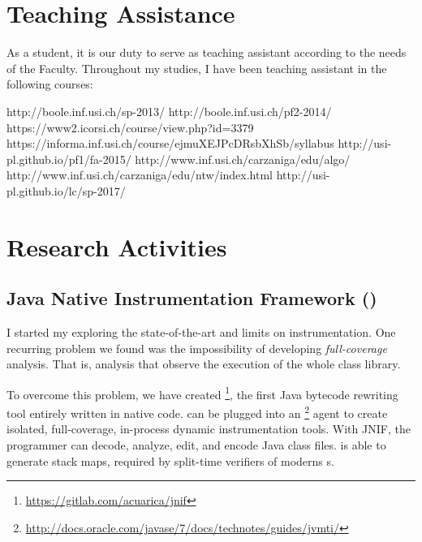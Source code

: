 \section{Teaching Assistance} \label{sec:ta}

As a \phd{} student, it is our duty to serve as teaching assistant according to the needs of the Faculty.
Throughout my \phd{} studies, I have been teaching assistant in the following courses:

\begin{tas}
	{http://boole.inf.usi.ch/sp-2013/}
	{http://boole.inf.usi.ch/pf2-2014/}
	{https://www2.icorsi.ch/course/view.php?id=3379}
	{https://informa.inf.usi.ch/course/ejmuXEJPcDRsbXhSb/syllabus}
	{http://usi-pl.github.io/pf1/fa-2015/}
	{http://www.inf.usi.ch/carzaniga/edu/algo/}
	{http://www.inf.usi.ch/carzaniga/edu/ntw/index.html}
	{http://usi-pl.github.io/lc/sp-2017/}
\end{tas}

\section{Research Activities} \label{sec:research}

\subsection*{Java Native Instrumentation Framework (\jnif{})}

I started my \phd{} exploring the state-of-the-art and limits on \java{} instrumentation.
One recurring problem we found was the impossibility of developing \emph{full-coverage} analysis.
That is, analysis that observe the execution of the whole \java{} class library.

To overcome this problem, we have created \jnif{}\footnote{\url{https://gitlab.com/acuarica/jnif}}, the first Java bytecode rewriting tool entirely written in native code.
\jnif{} can be plugged into an \jvmti{}\footnote{\url{http://docs.oracle.com/javase/7/docs/technotes/guides/jvmti/}} agent to create isolated, full-coverage, in-process dynamic instrumentation tools.
With JNIF, the programmer can decode, analyze, edit, and encode Java class files.
\jnif{} is able to generate stack maps, required by split-time verifiers of moderns \jvm{}s.

